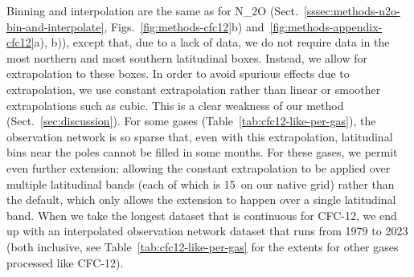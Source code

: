 Binning and interpolation are the same as for N_2O
(Sect.~\ref{sssec:methods-n2o-bin-and-interpolate}, Figs.~\ref{fig:methods-cfc12}b) and~\ref{fig:methods-appendix-cfc12}a), b)),
except that, due to a lack of data,
we do not require data in the most northern and most southern latitudinal boxes.
Instead, we allow for extrapolation to these boxes.
In order to avoid spurious effects due to extrapolation,
we use constant extrapolation rather than linear or smoother extrapolations such as cubic.
This is a clear weakness of our method (Sect.~\ref{sec:discussion}).
For some gases (Table~\ref{tab:cfc12-like-per-gas}), the observation network is so sparse
that, even with this extrapolation, latitudinal bins near the poles cannot be filled in some months.
For these gases, we permit even further extension:
allowing the constant extrapolation to be applied over multiple latitudinal bands
(each of which is 15\textdegree~on our native grid)
rather than the default, which only allows the extension to happen over a single latitudinal band.
When we take the longest dataset that is continuous for CFC-12,
we end up with an interpolated observation network dataset that runs from 1979 to 2023
(both inclusive, see Table~\ref{tab:cfc12-like-per-gas} for the extents for other gases processed like CFC-12).

